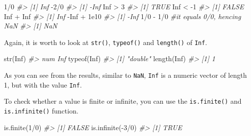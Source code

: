 \documentclass[
]{book}
\newenvironment{Shaded}{\begin{snugshade}}{\end{snugshade}}
\newcommand{\CommentTok}[1]{\textcolor[rgb]{0.56,0.35,0.01}{\textit{#1}}}
\newcommand{\ConstantTok}[1]{\textcolor[rgb]{0.00,0.00,0.00}{#1}}
\newcommand{\DecValTok}[1]{\textcolor[rgb]{0.00,0.00,0.81}{#1}}
\newcommand{\FloatTok}[1]{\textcolor[rgb]{0.00,0.00,0.81}{#1}}
\newcommand{\FunctionTok}[1]{\textcolor[rgb]{0.00,0.00,0.00}{#1}}
\newcommand{\NormalTok}[1]{#1}
\newcommand{\SpecialCharTok}[1]{\textcolor[rgb]{0.00,0.00,0.00}{#1}}
\begin{document}
\begin{Shaded}
\begin{Highlighting}[]
\DecValTok{1}\SpecialCharTok{/}\DecValTok{0}
\CommentTok{\#\textgreater{} [1] Inf}
\SpecialCharTok{{-}}\DecValTok{2}\SpecialCharTok{/}\DecValTok{0}
\CommentTok{\#\textgreater{} [1] {-}Inf}
\ConstantTok{Inf} \SpecialCharTok{\textgreater{}} \DecValTok{3}
\CommentTok{\#\textgreater{} [1] TRUE}
\ConstantTok{Inf} \SpecialCharTok{\textless{}} \SpecialCharTok{{-}}\DecValTok{1}
\CommentTok{\#\textgreater{} [1] FALSE}
\ConstantTok{Inf} \SpecialCharTok{+} \ConstantTok{Inf}
\CommentTok{\#\textgreater{} [1] Inf}
\SpecialCharTok{{-}}\ConstantTok{Inf} \SpecialCharTok{+} \FloatTok{1e10}
\CommentTok{\#\textgreater{} [1] {-}Inf}
\DecValTok{1}\SpecialCharTok{/}\DecValTok{0} \SpecialCharTok{{-}} \DecValTok{1}\SpecialCharTok{/}\DecValTok{0}        \CommentTok{\#it equals 0/0, hencing NaN}
\CommentTok{\#\textgreater{} [1] NaN}
\end{Highlighting}
\end{Shaded}

Again, it is worth to look at \texttt{str()}, \texttt{typeof()} and \texttt{length()} of \texttt{Inf}.

\begin{Shaded}
\begin{Highlighting}[]
\FunctionTok{str}\NormalTok{(}\ConstantTok{Inf}\NormalTok{)}
\CommentTok{\#\textgreater{}  num Inf}
\FunctionTok{typeof}\NormalTok{(}\ConstantTok{Inf}\NormalTok{)}
\CommentTok{\#\textgreater{} [1] "double"}
\FunctionTok{length}\NormalTok{(}\ConstantTok{Inf}\NormalTok{)}
\CommentTok{\#\textgreater{} [1] 1}
\end{Highlighting}
\end{Shaded}

As you can see from the results, similar to \texttt{NaN}, \texttt{Inf} is a numeric vector of length 1, but with the value \texttt{Inf}.

To check whether a value is finite or infinite, you can use the \texttt{is.finite()} and \texttt{is.infinite()} function.

\begin{Shaded}
\begin{Highlighting}[]
\FunctionTok{is.finite}\NormalTok{(}\DecValTok{1}\SpecialCharTok{/}\DecValTok{0}\NormalTok{)}
\CommentTok{\#\textgreater{} [1] FALSE}
\FunctionTok{is.infinite}\NormalTok{(}\SpecialCharTok{{-}}\DecValTok{3}\SpecialCharTok{/}\DecValTok{0}\NormalTok{)}
\CommentTok{\#\textgreater{} [1] TRUE}
\end{Highlighting}
\end{Shaded}
\end{document}
